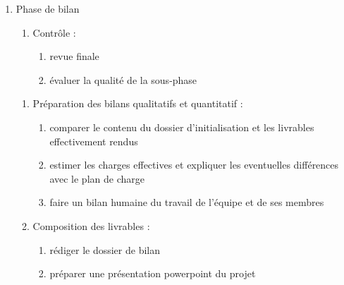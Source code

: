 \begin{enumerate}
\item Phase de bilan

          \begin{enumerate}
            \item Contrôle :
                \begin{enumerate}
                  \item revue finale
                  \item évaluer la qualité de la sous-phase
                \end{enumerate}
          \end{enumerate}

          \begin{enumerate}
            \item Préparation des bilans qualitatifs et quantitatif : 
                \begin{enumerate}
                  \item comparer le contenu du dossier d'initialisation et les livrables effectivement rendus
                  \item estimer les charges effectives et expliquer les eventuelles différences avec le plan de charge
                  \item faire un bilan humaine du travail de l'équipe et de ses membres
                \end{enumerate}
            \item Composition des livrables : 
                \begin{enumerate}
                  \item rédiger le dossier de bilan
                  \item préparer une présentation powerpoint du projet
                \end{enumerate}
          \end{enumerate}

\end{enumerate}